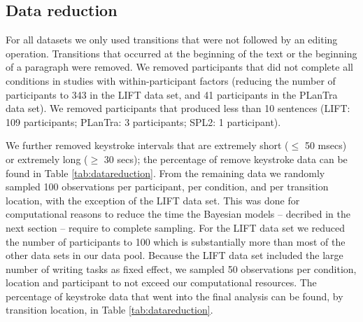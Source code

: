 \documentclass[
  english,
  man,floatsintext]{apa7}
\begin{document}
\hypertarget{data-reduction}{%
\subsection{Data reduction}\label{data-reduction}}

For all datasets we only used transitions that were not followed by an editing operation. Transitions that occurred at the beginning of the text or the beginning of a paragraph were removed. We removed participants that did not complete all conditions in studies with within-participant factors (reducing the number of participants to 343 in the LIFT data set, and 41 participants in the PLanTra data set). We removed participants that produced less than 10 sentences (LIFT: 109 participants; PLanTra: 3 participants; SPL2: 1 participant).

We further removed keystroke intervals that are extremely short (\(\le\) 50 msecs) or extremely long (\(\ge\) 30 secs); the percentage of remove keystroke data can be found in Table \ref{tab:datareduction}. From the remaining data we randomly sampled 100 observations per participant, per condition, and per transition location, with the exception of the LIFT data set. This was done for computational reasons to reduce the time the Bayesian models -- decribed in the next section -- require to complete sampling. For the LIFT data set we reduced the number of participants to 100 which is substantially more than most of the other data sets in our data pool. Because the LIFT data set included the large number of writing tasks as fixed effect, we sampled 50 observations per condition, location and participant to not exceed our computational resources. The percentage of keystroke data that went into the final analysis can be found, by transition location, in Table \ref{tab:datareduction}.
\end{document}
